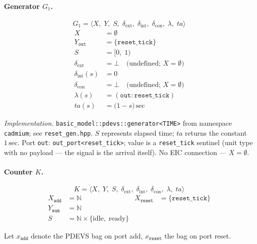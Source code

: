\paragraph{Generator $G_1$.}

\[
  G_1 = \langle X,\; Y,\; S,\;
          \delta_{\text{ext}},\; \delta_{\text{int}},\; \delta_{\text{con}},\;
          \lambda,\; ta \rangle
\]
\begin{align*}
  X &= \emptyset \\
  Y_{\texttt{out}} &= \{\texttt{reset\_tick}\} \\
  S &= \bigl[0,\; 1\bigr) \\
  \delta_{\text{ext}} &= \bot
    \quad\text{(undefined; } X = \emptyset\text{)} \\
  \delta_{\text{int}}(s) &= 0 \\
  \delta_{\text{con}} &= \bot
    \quad\text{(undefined; } X = \emptyset\text{)} \\
  \lambda(s) &= (\texttt{out}: \texttt{reset\_tick}) \\
  ta(s) &= \bigl(1 - s\bigr)\,\text{sec}
\end{align*}

\noindent\textit{Implementation.}
\texttt{basic\_model::pdevs::generator<TIME>}
from namespace \texttt{cadmium}; see \texttt{reset\_gen.hpp}.
$S$ represents elapsed time; $ta$ returns the constant $1\,\text{sec}$.
Port \texttt{out}: \texttt{out\_port<reset\_tick>}; value is a
\texttt{reset\_tick} sentinel (unit type with no payload --- the signal
is the arrival itself).
No EIC connection --- $X = \emptyset$.

\paragraph{Counter $K$.}

\[
  K = \langle X,\; Y,\; S,\;
       \delta_{\text{ext}},\; \delta_{\text{int}},\; \delta_{\text{con}},\;
       \lambda,\; ta \rangle
\]
\begin{align*}
  X_{\texttt{add}}   &= \mathbb{N}
    & X_{\texttt{reset}} &= \{\texttt{reset\_tick}\} \\
  Y_{\texttt{sum}}   &= \mathbb{N} \\
  S &= \mathbb{N} \times \{\text{idle},\; \text{ready}\}
\end{align*}

Let $x_{\texttt{add}}$ denote the PDEVS bag on port add,
$x_{\texttt{reset}}$ the bag on port reset.

